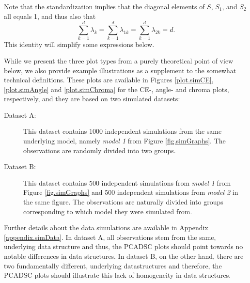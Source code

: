 \documentclass[titlepage,11pt,twoside]{article}
\begin{document}
Note that the standardization implies that the diagonal elements of $S$, $S_1$, and $S_2$ all equals 1, and thus also that
\begin{equation*}
\sum_{k=1}^d \lambda_k = \sum_{k=1}^d \lambda_{1k} = \sum_{k=1}^d \lambda_{2k} =  d.
\end{equation*}
This identity will simplify some expressions below.

While we present the three plot types from a purely theoretical point of view below, we also provide example illustrations as a supplement to the somewhat technical definitions. These plots are available in Figures \ref{plot.simCE}, \ref{plot.simAngle} and \ref{plot.simChroma} for the CE-, angle- and chroma plots, respectively, and they are based on two simulated datasets:
\begin{description}
\item[Dataset A:] This dataset contains 1000 independent simulations from the same underlying model, namely \textit{model 1} from Figure \ref{fig.simGraphs}. The observations are randomly divided into two groups.  
\item[Dataset B:] This dataset contains 500 independent simulations from \textit{model 1} from Figure \ref{fig.simGraphs} and 500 independent simulations from \textit{model 2} in the same figure. The observations are naturally divided into groups corresponding to which model they were simulated from.
\end{description} 
Further details about the data simulations are available in Appendix \ref{appendix.simData}. In dataset A, all observations stem from the same, underlying data structure and thus, the PCADSC plots should point towards no notable differences in data structures. In dataset B, on the other hand, there are two fundamentally different, underlying datastructures and therefore, the PCADSC plots should illustrate this lack of homogeneity in data structures.
\end{document}

